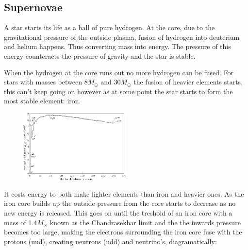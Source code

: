 \documentclass[11pt,a4paper,faculty=we,language=en,doctype=report]{cls/ugent-doc}
\begin{document}
\subsection{Supernovae}
A star starts its life as a ball of pure hydrogen. At the core, due to the
gravitational pressure of the outside plasma, fusion of hydrogen into deuterium
and helium happens. Thus converting mass into energy. The pressure of this energy
counteracts the pressure of gravity and the star is stable.

When the hydrogen at the core runs out no more hydrogen can be fused. For
stars with masses between $8M_\odot$ and $30M_\odot$ the
fusion of heavier elements starts, this can't keep going on however as at some
point the star starts to form the most stable element: iron. 
\begin{figure}[!ht]
	\centering
	\includegraphics[width=0.5\textwidth]{Binding_energy_curve.png}
\end{figure}
It costs energy
to both make lighter elements than iron and heavier ones.  As the iron core
builds up the outside pressure from the core starts to decrease as no new
energy is released. This goes on until  the treshold of an iron core with a mass of 1.4$M_\odot$ known as the 
Chandrasekhar limit and the the inwards pressure becomes too large, making the electrons surrounding the 
iron core fuse with the protons (uud),  creating neutrons (udd) and neutrino's, diagramatically:
\begin{figure}[!ht]
	\centering
\end{figure}\\
\end{document}
